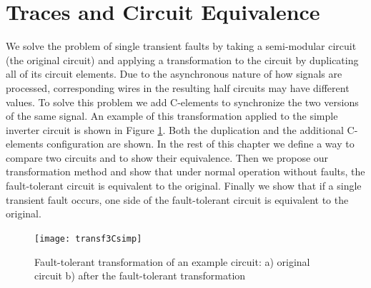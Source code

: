 \documentclass[12pt]{report}
\begin{document}
\section{Traces and Circuit Equivalence}
We solve the problem of single transient faults by taking a semi-modular circuit (the original circuit) and applying a transformation to the circuit by duplicating all of its circuit elements.  Due to the asynchronous nature of how signals are processed, corresponding wires in the resulting half circuits may have different values.  To solve this problem we add C-elements to synchronize the two versions of the same signal.   An example of this transformation applied to the simple inverter circuit is shown in Figure \ref{fig:dupschemeex}.  Both the duplication and the additional C-elements configuration are shown.  In the rest of this chapter we define a way to compare two circuits and to show their equivalence.  Then we propose our transformation method and show that under normal operation without faults, the fault-tolerant circuit is equivalent to the original.  Finally we show that if a single transient fault occurs, one side of the fault-tolerant circuit is equivalent to the original.\\
\begin{figure}
  \centering
    \texttt{[image: transf3Csimp]}
  \caption[Fault-tolerant transformation of an example circuit]{Fault-tolerant transformation of an example circuit: a) original circuit b) after the fault-tolerant transformation}
  \label{fig:dupschemeex}
\end{figure}
\end{document}
